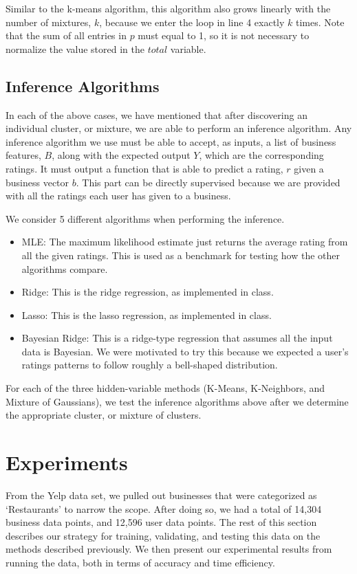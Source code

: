 \documentclass[11pt]{article}
\begin{document}
Similar to the k-means algorithm, this algorithm also grows linearly with the number of mixtures, $k$, because we enter the loop in line 4 exactly $k$ times. Note that the sum of all entries in $p$ must equal to 1, so it is not necessary to normalize the value stored in the $total$ variable.

\subsection{Inference Algorithms}
In each of the above cases, we have mentioned that after discovering an individual cluster, or mixture, we are able to perform an inference algorithm. Any inference algorithm we use must be able to accept, as inputs, a list of business features, $B$, along with the expected output $Y$, which are the corresponding ratings. It must output a function that is able to predict a rating, $r$ given a business vector $b$. This part can be directly supervised because we are provided with all the ratings each user has given to a business.

We consider 5 different algorithms when performing the inference.

\begin{itemize}
\item MLE: The maximum likelihood estimate just returns the average rating from all the given ratings. This is used as a benchmark for testing how the other algorithms compare.
\item Ridge: This is the ridge regression, as implemented in class.
\item Lasso: This is the lasso regression, as implemented in class.
\item Bayesian Ridge: This is a ridge-type regression that assumes all the input data is Bayesian. We were motivated to try this because we expected a user's ratings patterns to follow roughly a bell-shaped distribution.
\end{itemize}

For each of the three hidden-variable methods (K-Means, K-Neighbors, and Mixture of Gaussians), we test the inference algorithms above after we determine the appropriate cluster, or mixture of clusters.

\section{Experiments}
From the Yelp data set, we pulled out businesses that were categorized as `Restaurants' to narrow the scope. After doing so, we had a total of 14,304 business data points, and 12,596 user data points. The rest of this section describes our strategy for training, validating, and testing this data on the methods described previously. We then present our experimental results from running the data, both in terms of accuracy and time efficiency.
\end{document}
